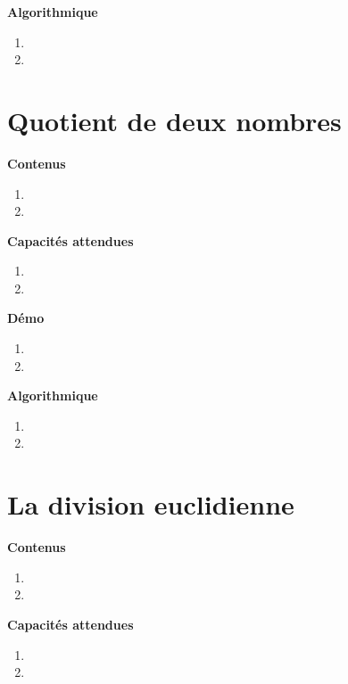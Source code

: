 \documentclass[10pt,a4paper]{article}
\begin{document}
\textbf{Algorithmique}

\begin{enumerate}
\item 
\item 
\end{enumerate}

\section{Quotient de deux nombres}

\textbf{Contenus}

\begin{enumerate} 
\item 
\item 
\end{enumerate}


\textbf{Capacités attendues}

\begin{enumerate}
\item 
\item 
\end{enumerate}

\textbf{Démo}

\begin{enumerate}
\item 
\item 
\end{enumerate}

\textbf{Algorithmique}

\begin{enumerate}
\item 
\item 
\end{enumerate}

\section{La division euclidienne}

\textbf{Contenus}

\begin{enumerate} 
\item 
\item 
\end{enumerate}


\textbf{Capacités attendues}

\begin{enumerate}
\item 
\item 
\end{enumerate}
\end{document}
